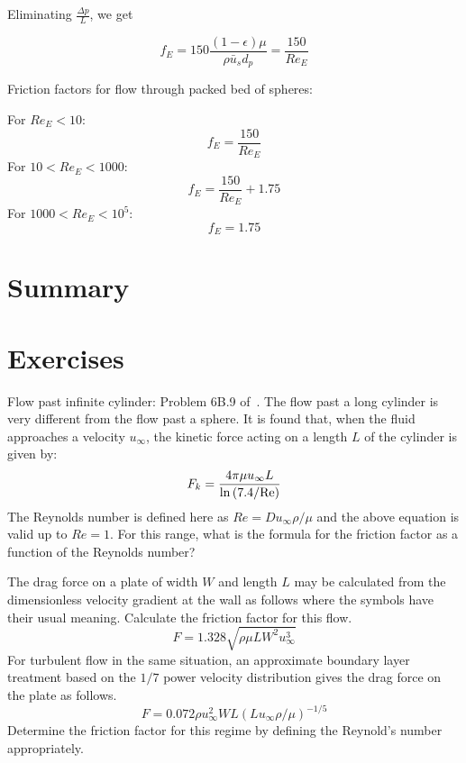 Eliminating $\frac{\Delta p}{L}$, we get 

$$ f_E =  150 \frac{ \left( 1-\epsilon\right) \mu}{\rho \bar{u}_s d_p} = \frac{150}{Re_E}$$

Friction factors for flow through packed bed of spheres:

For $Re_E < 10$:  $$f_E = \frac{150}{Re_E} $$ 
For $10 < Re_E < 1000$: $$f_E = \frac{150}{Re_E} + 1.75 $$ 
For $1000 < Re_E < 10^5 $: $$f_E = 1.75 $$


\section{Summary}



\section{Exercises}


\begin{question}
Flow past infinite cylinder: Problem 6B.9 of~\cite{bls}. The flow past a long cylinder is very different from the flow past a sphere. It is found that, when the fluid approaches a velocity $u_\infty$, the kinetic force acting on a length $L$ of the cylinder is given by: $$ F_k = {4 \pi \mu u_\infty L \over \ln \left(7.4 / \textrm{Re} \right)}$$
The Reynolds number is defined here as $Re = {D u_\infty \rho / \mu}$ and the above equation is valid up to $Re = 1$. For this range, what is the formula for the friction factor as a function of the Reynolds number?
\end{question}
\begin{solution}[print]
\end{solution}


\begin{question}
The drag force on a plate of width $W$ and length $L$ may be calculated from the dimensionless velocity gradient at the wall as follows where the symbols have their usual meaning. Calculate the friction factor for this flow.
$$ F = 1.328 \sqrt{\rho \mu L W^2 u_\infty^3} $$
For turbulent flow in the same situation, an approximate boundary layer treatment based on the $1/7$ power velocity distribution gives the drag force on the plate as follows.
$$ F = 0.072 \rho u_\infty^2 W L \left( L u_\infty \rho / \mu \right)^{-1/5}$$
Determine the friction factor for this regime by defining the Reynold's number appropriately.
\end{question}
\begin{solution}[print]
\end{solution}

